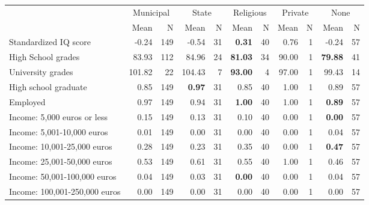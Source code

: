 \begin{tabular}{l r r r r r r r r r r}
\toprule
& \multicolumn{2}{c}{Municipal} & \multicolumn{2}{c}{State} & \multicolumn{2}{c}{Religious} & \multicolumn{2}{c}{Private} & \multicolumn{2}{c}{None} \\
& \scriptsize Mean & \scriptsize N & \scriptsize Mean & \scriptsize N & \scriptsize Mean & \scriptsize N & \scriptsize Mean & \scriptsize N & \scriptsize Mean & \scriptsize N \\
\midrule
Standardized IQ score &     -0.24 &       149 &     -0.54 &        31 & \textbf{     0.31} &        40 &      0.76 &         1 &     -0.24 &        57 \\
High School grades &     83.93 &       112 &     84.96 &        24 & \textbf{    81.03} &        34 &     90.00 &         1 & \textbf{    79.88} &        41 \\
University grades &    101.82 &        22 &    104.43 &         7 & \textbf{    93.00} &         4 &     97.00 &         1 &     99.43 &        14 \\
High school graduate &      0.85 &       149 & \textbf{     0.97} &        31 &      0.85 &        40 &      1.00 &         1 &      0.89 &        57 \\
Employed &      0.97 &       149 &      0.94 &        31 & \textbf{     1.00} &        40 &      1.00 &         1 & \textbf{     0.89} &        57 \\
Income: 5,000 euros or less &      0.15 &       149 &      0.13 &        31 &      0.10 &        40 &      0.00 &         1 & \textbf{     0.00} &        57 \\
Income: 5,001-10,000 euros &      0.01 &       149 &      0.00 &        31 &      0.00 &        40 &      0.00 &         1 &      0.04 &        57 \\
Income: 10,001-25,000 euros &      0.28 &       149 &      0.23 &        31 &      0.35 &        40 &      0.00 &         1 & \textbf{     0.47} &        57 \\
Income: 25,001-50,000 euros &      0.53 &       149 &      0.61 &        31 &      0.55 &        40 &      1.00 &         1 &      0.46 &        57 \\
Income: 50,001-100,000 euros &      0.04 &       149 &      0.03 &        31 & \textbf{     0.00} &        40 &      0.00 &         1 &      0.04 &        57 \\
Income: 100,001-250,000 euros &      0.00 &       149 &      0.00 &        31 &      0.00 &        40 &      0.00 &         1 &      0.00 &        57 \\

\end{tabular}
